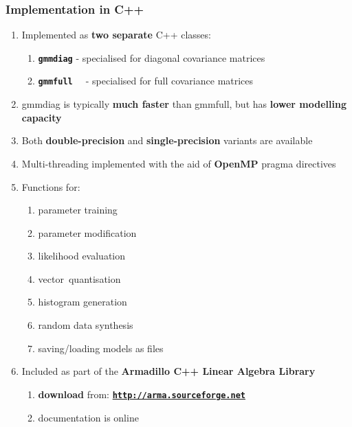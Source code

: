 \documentclass[usenames,dvipsnames]{beamer}
\def\_{{\tt\char95}}
\begin{document}
\begin{frame}
\frametitle{Implementation in C++}

\begin{enumerate}[{~~$\boldsymbol{\bullet}$}]

\item
Implemented as {\bf two separate} C++ classes:


\begin{enumerate}[{$\boldsymbol{\rightarrow}$}]
\renewcommand{\itemsep}{0.9ex}

\item
\texttt{\bf gmm\_diag} - specialised for diagonal covariance matrices

\item
\texttt{\bf gmm\_full~~} - specialised for full covariance matrices

\end{enumerate}
\vspace{1ex}

\item gmm\_diag is typically {\bf much faster} than gmm\_full, but has {\bf lower modelling capacity}
\vspace{1ex}

\item Both {\bf double-precision} and {\bf single-precision} variants are available
\vspace{1ex}

\item Multi-threading implemented with the aid of {\bf OpenMP} pragma directives
\vspace{1ex}

\item 
Functions for:
%
\begin{enumerate}[{$\boldsymbol{\rightarrow}$}]
\scriptsize
\item parameter training
\item parameter modification
\item likelihood evaluation
\item vector~quantisation
\item histogram generation
\item random data synthesis
\item saving/loading models as files
\end{enumerate}
\vspace{1ex}


\item Included as part of the {\bf Armadillo C++ Linear Algebra Library}

\begin{enumerate}[{$\boldsymbol{\rightarrow}$}]
\renewcommand{\itemsep}{0.9ex}

\item
{\bf download} from: \textcolor{red}{\href{http://arma.sourceforge.net}{\tt\textbf{http://arma.sourceforge.net}}}

\item documentation is online
\end{enumerate}


\end{enumerate}
\end{frame}
\end{document}
